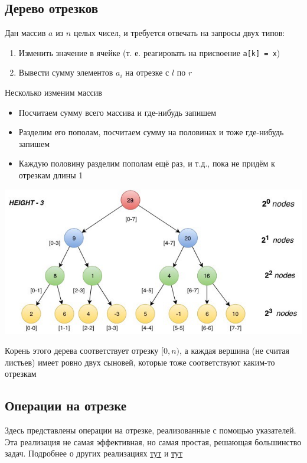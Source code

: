 \documentclass[a4paper]{article}
\newcommand{\code}[1]{\colorbox{codegray}{\texttt{#1}}}
\begin{document}
\subsection{Дерево отрезков}
Дан массив $a$ из $n$ целых чисел, и требуется отвечать на запросы двух типов:
\begin{enumerate}
    \item Изменить значение в ячейке (т. е. реагировать на присвоение \code{a[k] = x})
    \item Вывести сумму элементов $a_i$ на отрезке с $l$ по $r$
\end{enumerate}
Несколько изменим массив
\begin{itemize}
    \item Посчитаем сумму всего массива и где-нибудь запишем
    \item Разделим его пополам, посчитаем сумму на половинах и тоже где-нибудь запишем
    \item Каждую половину разделим пополам ещё раз, и т.д., пока не придём к отрезкам длины 1
\end{itemize}
\begin{center}
    \includegraphics[width=0.9\linewidth]{segtree-example.jpg}
    \label{segtree-ex}
\end{center}
Корень этого дерева соответствует отрезку $[0, n)$, а каждая вершина (не считая листьев) имеет ровно двух сыновей, которые тоже соответствуют каким-то отрезкам

\subsection{Операции на отрезке}
Здесь представлены операции на отрезке, реализованные с помощью указателей. Эта реализация не самая эффективная, но самая простая, решающая большинство задач. Подробнее о других реализациях \href{http://e-maxx.ru/algo/segment_tree}{тут} и \href{https://codeforces.com/blog/entry/18051}{тут}
\end{document}
